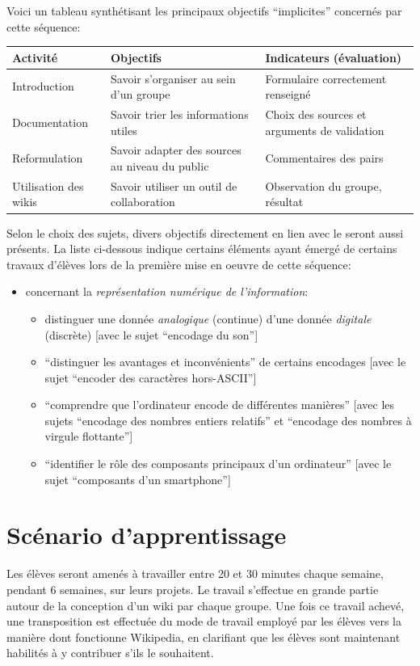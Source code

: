\documentclass[11pt,bibliography=totoc]{scrartcl}
\newcommand\rajout[1]{{\color{green} #1}}
\newcommand\rajouts[1]{{\color{cyan} #1}}
\begin{document}
\rajouts {
Voici un tableau synthétisant les principaux objectifs ``implicites'' concernés par cette séquence:
\begin{center}
   \begin{tabular}{@{}lm{.35\textwidth}m{.35\textwidth}@{}}\toprule
     Activité & Objectifs %
     & Indicateurs (évaluation) \\ 
     \midrule
     Introduction & Savoir s'organiser au sein d'un groupe & Formulaire correctement renseigné \\ 
     Documentation & Savoir trier les informations utiles & Choix des sources et arguments de validation \\
     Reformulation & Savoir adapter des sources au niveau du public & Commentaires des pairs \\
     Utilisation des wikis & Savoir utiliser un outil de collaboration & Observation du groupe, résultat \\
     \bottomrule
   \end{tabular}
 \end{center}
}

\rajout{Selon le choix des sujets, divers objectifs directement en lien avec le
  \cite{pecinfo} seront aussi présents. La liste ci-dessous indique certains
  éléments ayant émergé de certains travaux d'élèves lors de la première mise en
  oeuvre de cette séquence:
\begin{itemize}
\item concernant la \textit{représentation numérique de l'information}:
  \begin{itemize}
  \item distinguer une donnée \textit{analogique} (continue) d'une donnée
    \textit{digitale} (discrète) [avec le sujet ``encodage du son'']
  \item ``distinguer les avantages et inconvénients'' de certains
    encodages [avec le sujet ``encoder des caractères hors-ASCII'']
  \item ``comprendre que l'ordinateur encode de différentes
    manières'' [avec les sujets ``encodage des nombres entiers
    relatifs'' et ``encodage des nombres à virgule flottante'']
  \item ``identifier le rôle des composants principaux d'un ordinateur'' [avec
    le sujet ``composants d'un smartphone'']
  \end{itemize}
\end{itemize}
}

\section{Scénario d'apprentissage}
Les élèves seront amenés à travailler entre 20 et 30 minutes chaque semaine,
pendant 6 semaines, sur leurs projets. Le travail s'effectue en grande partie
autour de la conception d'un wiki par chaque groupe. Une fois ce travail achevé,
une transposition est effectuée du mode de travail employé par les élèves vers
la manière dont fonctionne Wikipedia, en clarifiant que les élèves sont
maintenant habilités à y contribuer s'ils le souhaitent.
\end{document}
